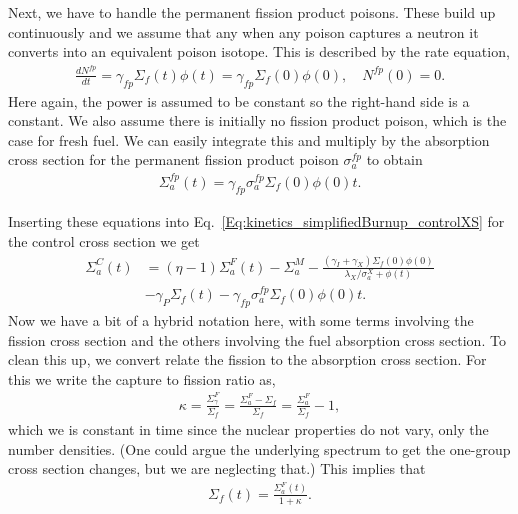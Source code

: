 Next, we have to handle the permanent fission product poisons. These build up continuously and we assume that any when any poison captures a neutron it converts into an equivalent poison isotope. This is described by the rate equation,
\begin{align}
  \frac{dN^{fp}}{dt} = \gamma_{fp} \Sigma_f(t) \phi(t) = \gamma_{fp} \Sigma_f(0) \phi(0) , \quad N^{fp}(0) = 0.
\end{align}
Here again, the power is assumed to be constant so the right-hand side is a constant. We also assume there is initially no fission product poison, which is the case for fresh fuel. We can easily integrate this and multiply by the absorption cross section for the permanent fission product poison $\sigma_a^{fp}$ to obtain
\begin{align}
  \Sigma_a^{fp}(t) = \gamma_{fp} \sigma_a^{fp} \Sigma_f(0) \phi(0) t.
\end{align}

Inserting these equations into Eq.~\eqref{Eq:kinetics_simplifiedBurnup_controlXS} for the control cross section we get
\begin{align}
  \Sigma_a^C(t) &= ( \eta - 1 ) \Sigma_a^F(t) - \Sigma_a^M - \frac{ ( \gamma_I + \gamma_X ) \Sigma_f(0) \phi(0) }{ \lambda_X / \sigma_a^X + \phi(t) } \nonumber \\
   &- \gamma_P \Sigma_f(t) - \gamma_{fp}  \sigma_a^{fp} \Sigma_f(0) \phi(0) t .
\end{align}
Now we have a bit of a hybrid notation here, with some terms involving the fission cross section and the others involving the fuel absorption cross section. To clean this up, we convert relate the fission to the absorption cross section. For this we write the capture to fission ratio as,
\begin{align}
  \kappa = \frac{\Sigma_\gamma^F}{\Sigma_f} = \frac{\Sigma_a^F - \Sigma_f}{\Sigma_f} = \frac{\Sigma_a^F}{\Sigma_f} - 1,
\end{align}
which we is constant in time since the nuclear properties do not vary, only the number densities. (One could argue the underlying spectrum to get the one-group cross section changes, but we are neglecting that.) This implies that
\begin{align}
  \Sigma_f(t) = \frac{\Sigma_a^F(t)}{ 1 + \kappa } .
\end{align}


